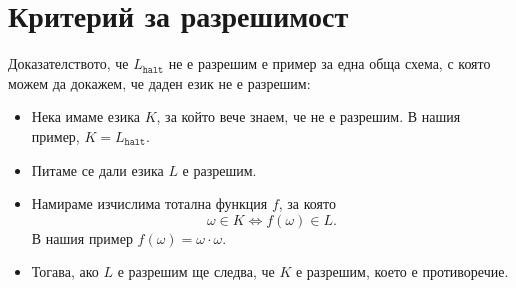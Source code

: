 \section{Критерий за разрешимост}

\begin{framed}
  Доказателството, че $L_{\texttt{halt}}$ не е разрешим е пример за една обща схема, с която можем да докажем, че даден език не е разрешим:
  \begin{itemize}
  \item 
    Нека имаме езика $K$, за който вече знаем, че не е разрешим.
    В нашия пример, $K = L_{\texttt{halt}}$.
  \item
    Питаме се дали езика $L$ е разрешим.
  \item
    Намираме изчислима тотална функция $f$, за която
    \[\omega \in K \iff f(\omega) \in L.\]
    В нашия пример $f(\omega) = \omega \cdot \omega$.
  \item
    Тогава, ако $L$ е разрешим ще следва, че $K$ е разрешим, което е противоречие.
  \end{itemize}
\end{framed}

